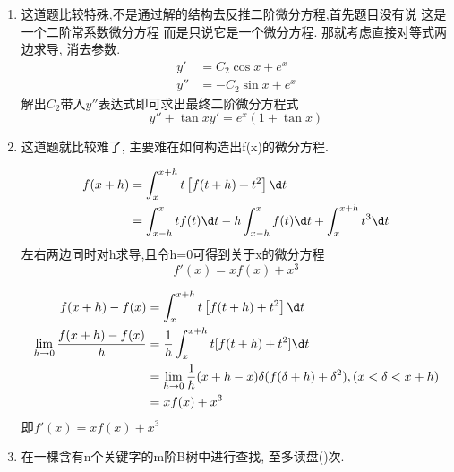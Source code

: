 \documentclass[12pt, a4paper, oneside, UTF8]{ctexbook}
\begin{document}
\begin{enumerate}
    \item 这道题比较特殊,不是通过解的结构去反推二阶微分方程,首先题目没有说{\color{red} 这是一个二阶常系数微分方程}
    而是只说它是一个微分方程. 那就考虑直接对等式两边求导, 消去参数. 
    \begin{align*}
        y' &= C_2 \cos{x} + e^x \\
        y'' &= -C_2 \sin{x} + e^x 
    \end{align*}
    解出$C_2$带入$y''$表达式即可求出最终二阶微分方程式 
    $$
    y'' + \tan{x} y' = e^x(1+\tan{x})
    $$ 

    \item 这道题就比较难了, 主要难在如何构造出f(x)的微分方程. 
    \begin{solution}[方法一]
    \begin{align*}
        f(x+h) &= \int_{x}^{x+h}t\left[f(t+h)+t^2\right]\d t \\
        &= \int_{x-h}^{x}tf(t)\d t - h\int_{x-h}^{x}f(t)\d t + \int_{x}^{x+h}t^3\d t 
    \end{align*}
    {\color{red} 左右两边同时对h求导,且令h=0}可得到关于x的微分方程 
    $$
    f'(x) = xf(x) + x^3
    $$
    \end{solution}

    \begin{solution}
    \begin{align*}
        f(x+h) - f(x) &= \int_{x}^{x+h}t\left[f(t+h)+t^2\right]\d t \\
        \lim_{h\to 0}\frac{f(x+h) - f(x)}{h} &= \frac{1}{h} \int_{x}^{x+h}t[f(t+h)+t^2]\d t \\
        &= \lim_{h\to 0}\frac{1}{h} (x+ h - x) \delta(f(\delta + h) + \delta^2), (x < \delta < x + h) \\
        &= xf(x) + x^3
    \end{align*}
    即$f'(x) = xf(x)+x^3$
    \end{solution}


    \item 在一棵含有n个关键字的m阶B树中进行查找, 至多读盘(\qquad)次.
\end{enumerate}
\ifx\allfiles\undefined
\end{document}
